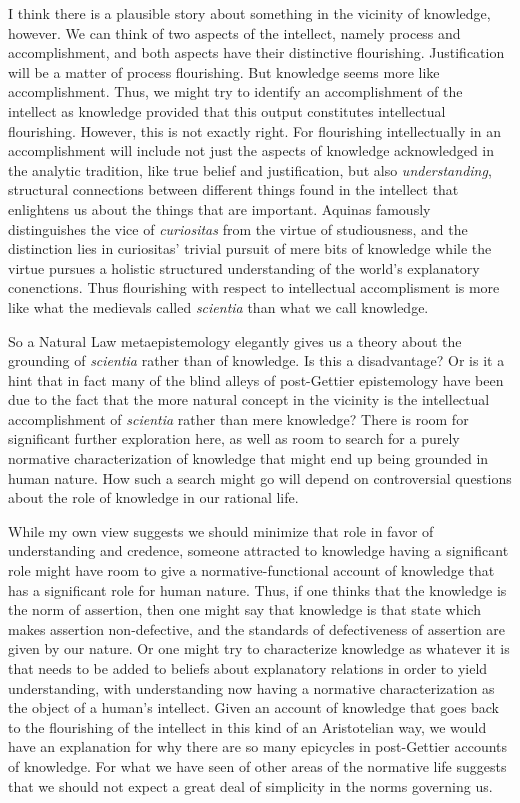 I think there is a plausible story about something in the vicinity of knowledge, however. We can think of two aspects of the
intellect, namely process and accomplishment, and both aspects have their distinctive flourishing. Justification will be a matter of
process flourishing. But knowledge seems more like accomplishment. Thus, we might try to identify an accomplishment of the intellect as 
knowledge provided that this output constitutes intellectual flourishing. However, this is not exactly right. For flourishing
intellectually in an accomplishment will include not just the aspects of knowledge acknowledged in the analytic tradition, like true 
belief and justification, but also \textit{understanding}, structural connections between different things found in the intellect that
enlightens us about the things that are important. Aquinas famously distinguishes the vice of \textit{curiositas} from the virtue of
studiousness, and the distinction lies in curiositas' trivial pursuit of mere bits of knowledge while the virtue pursues a holistic
structured understanding of the world's explanatory conenctions. Thus flourishing with respect to intellectual accomplisment is more
like what the medievals called \textit{scientia} than what we call knowledge.

So a Natural Law metaepistemology elegantly gives us a theory about the grounding of \textit{scientia} rather than of knowledge. 
Is this a disadvantage? Or is it a hint that in fact many of the blind alleys of post-Gettier epistemology have been due to the
fact that the more natural concept in the vicinity is the intellectual accomplishment of \textit{scientia} rather than mere 
knowledge?  There is room for significant further exploration here, as well as room to search for a purely normative characterization
of knowledge that might end up being grounded in human nature. How such a search might go will depend on controversial questions about
the role of knowledge in our rational life. 

While my own view suggests we should minimize that role in favor of understanding and credence, 
someone attracted to knowledge having a significant role might have room to give a normative-functional account of knowledge that
has a significant role for human nature. Thus, if one thinks that the knowledge is the norm of assertion, then one might say that
knowledge is that state which makes assertion non-defective, and the standards of defectiveness of assertion are given by our nature.
Or one might try to characterize knowledge as whatever it is that needs to be added to beliefs about explanatory relations in order to yield
understanding, with understanding now having a normative characterization as the object of a human's intellect.
Given an account of knowledge that goes back to the flourishing of the intellect in this kind of an Aristotelian way, we would have
an explanation for why there are so many epicycles in post-Gettier accounts of knowledge. For what we have seen of other areas of the
normative life suggests that we should not expect a great deal of simplicity in the norms governing us. 

